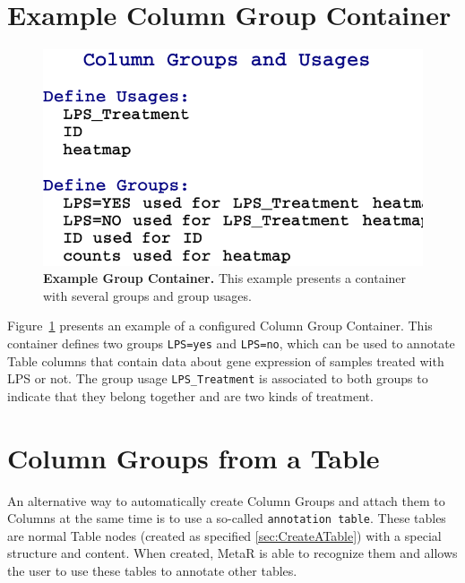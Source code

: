 \section{Example Column Group Container}

\begin{figure}
  \centering
  \includegraphics[width=\figWidthNarrow]{figures/ExampleGroupContainer.pdf}
\caption[Example Group Container.]{\textbf{Example Group Container.} This example presents a container with several groups and group usages.}
\label{fig:ExampleGroupContainer}
\end{figure}

Figure~\ref{fig:ExampleGroupContainer} presents an example of a configured Column Group Container. This container defines two groups \texttt{LPS=yes} and \texttt{LPS=no}, which can be used to annotate Table columns that contain data about gene expression of samples treated with LPS or not.  The group usage \texttt{LPS\_Treatment} is associated to both groups to indicate that they belong together and are two kinds of treatment.


\section{Column Groups from a Table}\label{sec:ColumnGroupsTable}
An alternative way to automatically create Column Groups and attach them to Columns at the same time is to use a so-called \texttt{annotation table}. These tables are normal Table nodes (created as specified \ref{sec:CreateATable}) with a special structure and content. When created, MetaR is able to recognize them and allows the user to use these tables to annotate other tables. 

